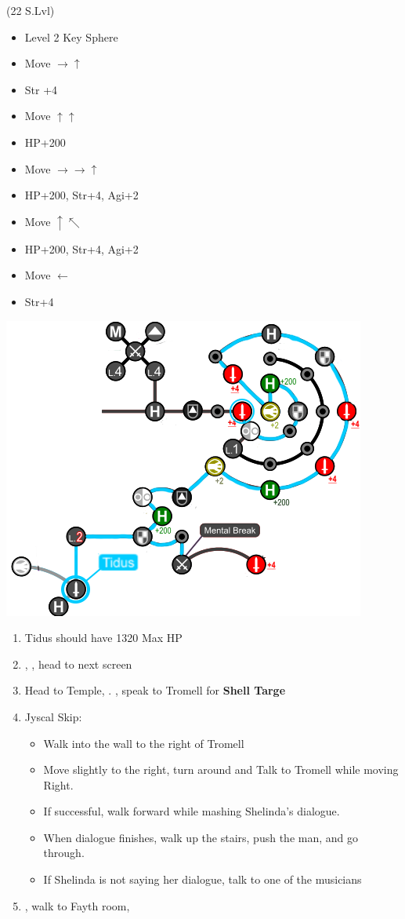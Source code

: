 \begin{spheregrid}
  \begin{itemize}
    \tidusf (22 S.Lvl)
    \begin{itemize}
      \item Level 2 Key Sphere
      \item Move $\rightarrow\uparrow$
      \item Str +4
      \item Move $\uparrow\uparrow$
      \item HP+200
      \item Move $\rightarrow\rightarrow\uparrow$
      \item HP+200, Str+4, Agi+2
      \item Move $\uparrow\nwarrow$
      \item HP+200, Str+4, Agi+2
      \item Move $\leftarrow$
      \item Str+4
    \end{itemize}
    \includegraphics[width=.8\columnwidth]{graphics/Tidus_post_crawler}
  \end{itemize}
\end{spheregrid}
\begin{enumerate}[resume]
  \item Tidus should have 1320 Max HP
  \item \sd, \cs[0:40], head to next screen
  \item Head to Temple, \sd. \save, speak to Tromell for \textbf{Shell Targe}
  \item Jyscal Skip:
        \begin{itemize}
          \item Walk into the wall to the right of Tromell
          \item Move slightly to the right, turn around and Talk to Tromell while moving Right.
          \item If successful, walk forward while mashing Shelinda's dialogue.
          \item When dialogue finishes, walk up the stairs, push the man, and go through.
          \item If Shelinda is not saying her dialogue, talk to one of the musicians
        \end{itemize}
  \item \sd, walk to Fayth room, \cs[2:10]
\end{enumerate}
